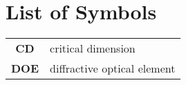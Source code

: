 \cleardoublepage
\chapter*{List of Symbols}
\begin{tabular}{cp{}}
  \textbf{CD} & critical dimension \\
  \textbf{DOE} & diffractive optical element
\end{tabular}\\
